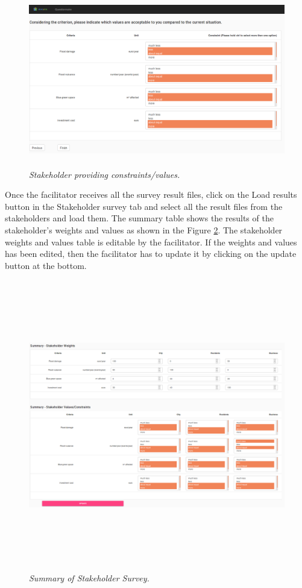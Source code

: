 \documentclass[a4paper]{article}
\begin{document}
\begin{figure}
\begin{center}
\includegraphics[width=6in, height=3in]{img/values.png}
\caption{\small \sl Stakeholder providing constraints/values.\label{fig:values}}
\end{center}
\end{figure}

Once the facilitator receives all the survey result files, click on the Load results button in the Stakeholder survey tab and select all the result files from the stakeholders and load them. The summary table shows the results of the stakeholder's weights and values as shown in the Figure \ref{fig:sSummary}. The stakeholder weights and values table is editable by the facilitator. If the weights and values has been edited, then the facilitator has to update it by clicking on the update button at the bottom.

\begin{figure}
\begin{center}
\includegraphics[width=6in, height=5in]{img/sSummary.png}
\caption{\small \sl Summary of Stakeholder Survey.\label{fig:sSummary}}
\end{center}
\end{figure}
\end{document}
